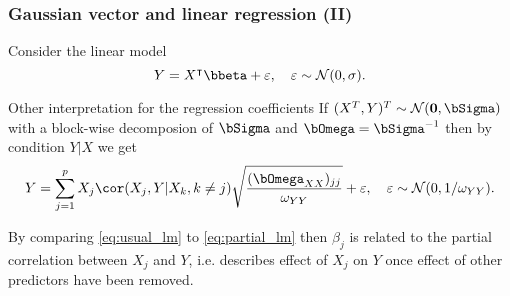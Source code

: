 \begin{frame}
  \frametitle{Gaussian vector and linear regression (II)}

  Consider the linear model
  \begin{equation}
      \label{eq:usual_lm}
    Y = X^\intercal\bbeta + \varepsilon, \quad \varepsilon\sim\mathcal{N}(0,\sigma).
  \end{equation}

  \begin{overlayarea}{\textwidth}{\textheight}

    \begin{block}{Other interpretation for the regression coefficients}
      If   $(X^T,  Y)^T\sim   \mathcal{N}(\mathbf{0},\bSigma)$  with   a
      block-wise  decomposion  of $\bSigma$  and  $\bOmega=\bSigma^{-1}$
      then by condition $Y|X$ we get
      \begin{equation}
        \label{eq:partial_lm}
        Y      =    \sum_{j=1}^p  X_j     \cor(X_j,Y|X_k,      k\neq      j)
        \sqrt{\frac{(\bOmega_{XX})_{jj}}{\omega_{YY}}}+ \varepsilon,
        \quad \varepsilon\sim\mathcal{N}(0,1/\omega_{YY}).
      \end{equation}

      By comparing \eqref{eq:usual_lm} to \eqref{eq:partial_lm}
      then \alert{$\beta_j$ is related to the partial correlation between $X_j$
        and $Y$},  i.e. describes  effect of  $X_j$ on  $Y$ once  effect of
      other predictors have been removed.
    \end{block}

  \end{overlayarea}
\end{frame}

